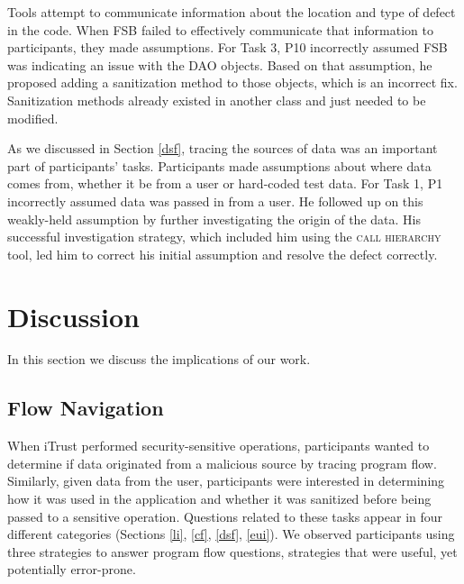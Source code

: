 \documentclass[10pt,journal,compsoc]{IEEEtran}
\begin{document}
Tools attempt to communicate information about the location and type of defect in the code.
When FSB failed to effectively communicate that information to participants, they made assumptions.
For Task 3, P10 incorrectly assumed FSB was indicating an issue with the DAO objects. 
Based on that assumption, he proposed adding a sanitization method to those objects, which is an incorrect fix.
Sanitization methods already existed in another class and just needed to be modified.


As we discussed in Section \ref{dsf}, tracing the sources of data was an important part of participants' tasks.
Participants made assumptions about where data comes from, whether it be from a user or hard-coded test data.
For Task 1, P1 incorrectly assumed data was passed in from a user.
He followed up on this weakly-held assumption by further investigating the origin of the data.
His successful investigation strategy, which included him using the \textsc{call hierarchy} tool, led him to correct his initial assumption and resolve the defect correctly.






\section{Discussion}
\label{sec:discussion}
In this section we discuss the implications of our work.

\subsection{Flow Navigation}
\label{flowNav}
When iTrust performed security-sensitive operations, participants wanted to determine if data originated from a malicious source
by tracing program flow.
Similarly, given data from the user, participants were interested in determining how it was used in the application and whether it was sanitized before being passed to a sensitive operation. Questions related to these tasks appear in four different categories (Sections \ref{li}, \ref{cf}, \ref{dsf}, \ref{eui}).
We observed participants using three strategies to answer program flow questions,
strategies that were useful, yet potentially error-prone.
\end{document}
